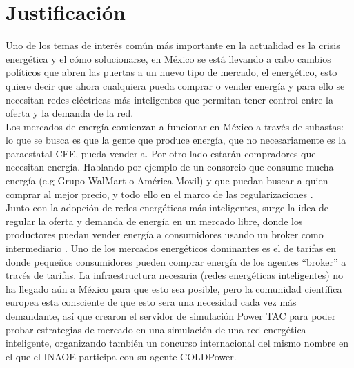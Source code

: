 \section{Justificación}
Uno de los temas de interés común más importante en la actualidad es la crisis energética y el cómo solucionarse, en México se está llevando a cabo cambios políticos que abren las puertas a un nuevo tipo de mercado, el energético, esto quiere decir que ahora cualquiera pueda comprar o vender energía y para ello se necesitan redes eléctricas más inteligentes que permitan tener control entre la oferta y la demanda de la red.
\\

Los mercados de energía comienzan a funcionar en México a través de subastas: lo que se busca es que la gente que produce energía, que no necesariamente es la paraestatal CFE, pueda venderla. Por otro lado estarán compradores  que necesitan energía. Hablando por ejemplo de un consorcio que consume mucha energía (e.g Grupo WalMart o América Movil) y que puedan buscar a quien comprar al mejor precio, y todo ello en el marco de las regularizaciones \cite{GRiveraProyectoDeIADelInaoe}.\\

Junto con la adopción de redes energéticas más inteligentes, surge la idea de regular la oferta y demanda de energía en un mercado libre, donde los productores puedan vender energía a consumidores usando un broker como intermediario \cite{Fixed-priceTariffG2015}. 
Uno de los mercados energéticos dominantes es el de tarifas en donde pequeños consumidores pueden comprar energía de los agentes ``broker'' a través de tarifas.
La infraestructura necesaria (redes energéticas inteligentes) no ha llegado aún a México para que esto sea posible, pero la comunidad científica europea esta consciente de que esto sera una necesidad cada vez más demandante, así que crearon el servidor de simulación Power TAC para poder probar estrategias de mercado en una simulación de una red energética inteligente, organizando también un concurso internacional del mismo nombre en el que el INAOE participa con su agente COLDPower.
